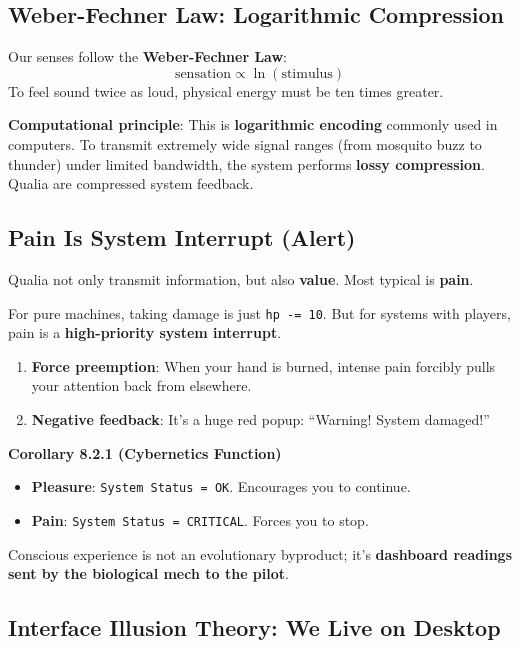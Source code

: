 \subsection{Weber-Fechner Law: Logarithmic Compression}

Our senses follow the \textbf{Weber-Fechner Law}:
\[
\text{sensation} \propto \ln(\text{stimulus})
\]
To feel sound twice as loud, physical energy must be ten times greater.

\textbf{Computational principle}:
This is \textbf{logarithmic encoding} commonly used in computers.
To transmit extremely wide signal ranges (from mosquito buzz to thunder) under limited bandwidth, the system performs \textbf{lossy compression}.
Qualia are compressed system feedback.

\subsection{Pain Is System Interrupt (Alert)}

Qualia not only transmit information, but also \textbf{value}. Most typical is \textbf{pain}.

For pure machines, taking damage is just \texttt{hp -= 10}.
But for systems with players, pain is a \textbf{high-priority system interrupt}.

\begin{enumerate}
\item \textbf{Force preemption}: When your hand is burned, intense pain forcibly pulls your attention back from elsewhere.
\item \textbf{Negative feedback}: It's a huge red popup: ``Warning! System damaged!''
\end{enumerate}

\textbf{Corollary 8.2.1 (Cybernetics Function)}
\begin{itemize}
\item \textbf{Pleasure}: \texttt{System Status = OK}. Encourages you to continue.
\item \textbf{Pain}: \texttt{System Status = CRITICAL}. Forces you to stop.
\end{itemize}

Conscious experience is not an evolutionary byproduct; it's \textbf{dashboard readings sent by the biological mech to the pilot}.

\subsection{Interface Illusion Theory: We Live on Desktop}

